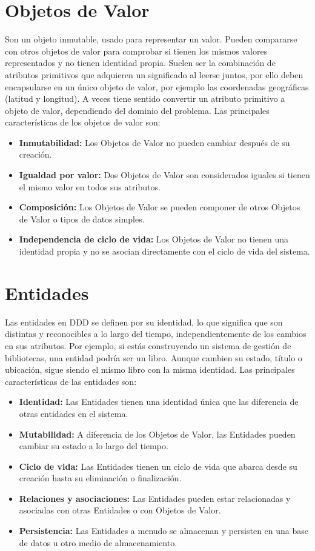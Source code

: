 \section*{Objetos de Valor}

Son un objeto inmutable, usado para representar un valor. Pueden compararse con otros objetos de valor para comprobar
si tienen los mismos valores representados y no tienen identidad propia.
Suelen ser la combinación de atributos primitivos que adquieren un significado al leerse juntos, por ello deben encapsularse
en un único objeto de valor, por ejemplo las coordenadas geográficas (latitud y longitud). A veces tiene sentido convertir
un atributo primitivo a objeto de valor, dependiendo del dominio del problema. Las principales características de los objetos de valor son:

\begin{itemize}
  \item \textbf{Inmutabilidad:} Los Objetos de Valor no pueden cambiar después de su creación.
  \item \textbf{Igualdad por valor:} Dos Objetos de Valor son considerados iguales si tienen el mismo valor en todos sus atributos.
  \item \textbf{Composición:} Los Objetos de Valor se pueden componer de otros Objetos de Valor o tipos de datos simples.
  \item \textbf{Independencia de ciclo de vida:}  Los Objetos de Valor no tienen una identidad propia y no se asocian directamente con el ciclo de vida del sistema.
\end{itemize}


\section*{Entidades}

Las entidades en DDD se definen por su identidad, lo que significa que son distintas y reconocibles a lo largo del tiempo,
independientemente de los cambios en sus atributos. Por ejemplo, si estás construyendo un sistema de gestión de bibliotecas,
una entidad podría ser un libro. Aunque cambien su estado, título o ubicación, sigue siendo el mismo libro con la misma identidad.
Las principales características de las entidades son:

\begin{itemize}
  \item \textbf{Identidad:} Las Entidades tienen una identidad única que las diferencia de otras entidades en el sistema.
  \item \textbf{Mutabilidad:} A diferencia de los Objetos de Valor, las Entidades pueden cambiar su estado a lo largo del tiempo.
  \item \textbf{Ciclo de vida:} Las Entidades tienen un ciclo de vida que abarca desde su creación hasta su eliminación o finalización.
  \item \textbf{Relaciones y asociaciones:} Las Entidades pueden estar relacionadas y asociadas con otras Entidades o con Objetos de Valor.
  \item \textbf{Persistencia:} Las Entidades a menudo se almacenan y persisten en una base de datos u otro medio de almacenamiento.
\end{itemize}

